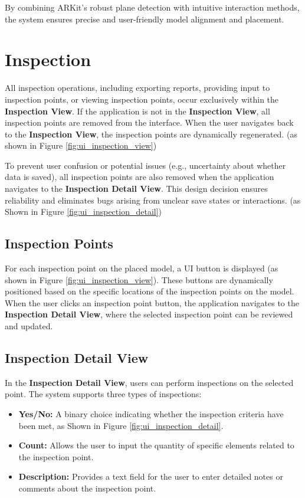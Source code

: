 By combining ARKit’s robust plane detection with intuitive interaction methods, the system ensures precise and user-friendly model alignment and placement.


\section{Inspection}

All inspection operations, including exporting reports, providing input to inspection points, or viewing inspection points, occur exclusively within the \textbf{Inspection View}. If the application is not in the \textbf{Inspection View}, all inspection points are removed from the interface. When the user navigates back to the \textbf{Inspection View}, the inspection points are dynamically regenerated. (as shown in Figure \ref{fig:ui_inspection_view})

To prevent user confusion or potential issues (e.g., uncertainty about whether data is saved), all inspection points are also removed when the application navigates to the \textbf{Inspection Detail View}. This design decision ensures reliability and eliminates bugs arising from unclear save states or interactions. (as Shown in Figure \ref{fig:ui_inspection_detail})

\subsection{Inspection Points}
For each inspection point on the placed model, a UI button is displayed (as shown in Figure \ref{fig:ui_inspection_view}). These buttons are dynamically positioned based on the specific locations of the inspection points on the model. When the user clicks an inspection point button, the application navigates to the \textbf{Inspection Detail View}, where the selected inspection point can be reviewed and updated.

\subsection{Inspection Detail View}
In the \textbf{Inspection Detail View}, users can perform inspections on the selected point. The system supports three types of inspections:
\begin{itemize}
    \item \textbf{Yes/No:} A binary choice indicating whether the inspection criteria have been met, as Shown in Figure \ref{fig:ui_inspection_detail}.
    \item \textbf{Count:} Allows the user to input the quantity of specific elements related to the inspection point.
    \item \textbf{Description:} Provides a text field for the user to enter detailed notes or comments about the inspection point.
\end{itemize}

